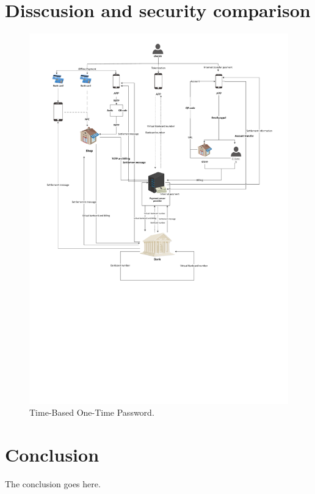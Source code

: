 \documentclass[journal]{IEEEtran}
\begin{document}
\section{Disscusion and security comparison}
\begin{figure}[htbp]
\centerline{\includegraphics[scale=0.5]{datu.pdf}}
\caption{Time-Based One-Time Password.}
\label{fig}
\end{figure}


\section{Conclusion}
The conclusion goes here.





\end{document}
